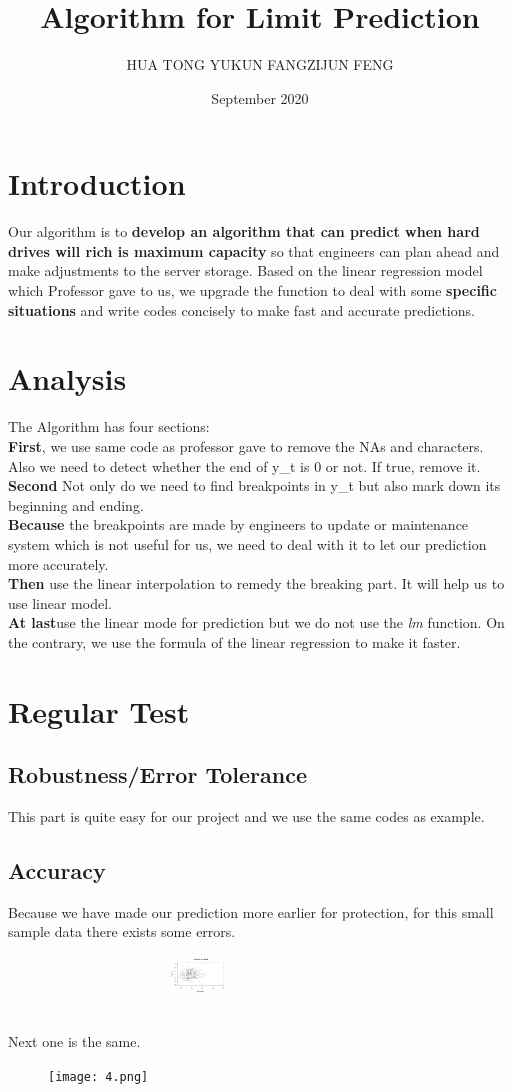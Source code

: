 \documentclass{article}
\title{\vspace{-4em}Algorithm for Limit Prediction}
\author{HUA TONG \quad YUKUN FANG\quad ZIJUN FENG}
\date{September 2020}
\begin{document}
\maketitle
\section{Introduction}
 Our algorithm is to \textbf{develop an algorithm that can predict when hard drives will rich is maximum capacity} so that engineers can plan ahead and make adjustments to the server storage.\newline
 Based on the linear regression model which Professor gave to us, we upgrade the function to deal with some \textbf{specific situations} and write codes concisely to make fast and accurate predictions.
\section{Analysis}
 The Algorithm has four sections:\\
 \textbf{First}, we use same code as professor gave to remove the NAs and characters. Also we need to detect whether the end of y\_t is 0 or not. If true, remove it.\\
 \textbf{Second} Not only do we need to find breakpoints in y\_t but also mark down its beginning and ending.\\
 \textbf{Because} the breakpoints are made by engineers to update or maintenance system  which is not useful for us, we need to deal with it to let our prediction more accurately.\\
 \textbf{Then} use the linear interpolation to remedy the breaking part. It will help us to use linear model.\\
 \textbf{At last}use the linear mode for prediction but we do not use the \emph{lm} function. On the contrary, we use the formula of the linear regression to make it faster.
\section{Regular Test}
\subsection{Robustness/Error Tolerance}
This part is quite easy for our project and we use the same codes as example.
\subsection{Accuracy}
Because we have made our prediction more earlier for protection, for this small sample data there exists some errors.
\begin{figure}[ht]
    \centering
	\includegraphics[width=8cm,height=1cm]{1.png}
\end{figure}\\
Next one is the same.
\begin{figure}[ht]
    \centering
	\texttt{[image: 4.png]}
\end{figure}
\end{document}
